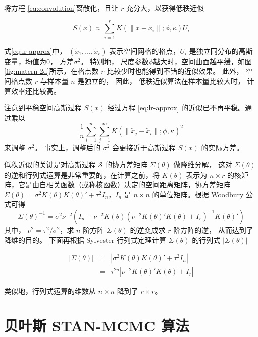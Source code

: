 \documentclass[12pt,a4paper,UTF8,twoside]{book}
\theoremstyle{definition}
\theoremstyle{definition}
\theoremstyle{definition}
\theoremstyle{remark}
\begin{document}
\noindent 将方程 \eqref{eq:convolution}离散化，且让 \(r\)
充分大，以获得低秩近似 \citep{PrevMap2017JSS}

\begin{equation}
S(x) \approx \sum_{i = 1}^r K(\|x-\tilde{x}_{i}\|; \phi, \kappa) U_{i} \label{eq:lr-approx}
\end{equation}

\noindent 式\eqref{eq:lr-approx}中，
\((\tilde{x}_{1},\ldots,\tilde{x}_{r})\) 表示空间网格的格点，\(U_{i}\)
是独立同分布的高斯变量，均值为0， 方差\(\sigma^2\)。 特别地，
尺度参数\(\phi\)越大时，空间曲面越平缓，如图
\ref{fig:matern-2d}所示，在格点数 \(r\) 比较少时也能得到不错的近似效果。
此外， 空间格点数 \(r\) 与样本量 \(n\) 是独立的， 因此，
低秩近似算法在样本量比较大时， 计算效率还比较高。

注意到平稳空间高斯过程 \(S(x)\) 经过方程 \eqref{eq:lr-approx}
的近似已不再平稳。通过乘以
\[\frac{1}{n}\sum_{i = 1}^n \sum_{j = 1}^m K(\|\tilde{x}_{j}-\tilde{x}_{i}\|; \phi, \kappa)^2\]
来调整 \(\sigma^2\)。 事实上，调整后的 \(\sigma^2\) 会更接近于高斯过程
\(S(x)\) 的实际方差。

低秩近似的关键是对高斯过程 \(\mathcal{S}\) 的协方差矩阵
\(\Sigma(\theta)\) 做降维分解， 这对 \(\Sigma(\theta)\)
的逆和行列式运算是非常重要的，在计算之前，将 \(K(\theta)\) 表示为
\(n\times r\)
的核矩阵，它是由自相关函数（或称核函数）决定的空间距离矩阵，协方差矩阵
\(\Sigma(\theta) = \sigma^2K(\theta)K(\theta)'+\tau^2 I_{n}\)，\(I_{n}\)
是 \(n\times n\) 的单位矩阵。根据 Woodbury 公式可得
\[\Sigma(\theta)^{-1} = \sigma^2\nu^{-2}(I_{n}-\nu^{-2}K(\theta)(\nu^{-2}K(\theta)' K(\theta)+I_{r})^{-1}K(\theta)')\]
其中， \(\nu^2 = \tau^2/\sigma^2\)，求 \(n\) 阶方阵 \(\Sigma(\theta)\)
的逆变成求 \(r\) 阶方阵的逆， 从而达到了降维的目的。 下面再根据
Sylvester 行列式定理计算 \(\Sigma(\theta)\) 的行列式
\(|\Sigma(\theta)|\)

\begin{eqnarray*}
|\Sigma(\theta)| & = & |\sigma^2K(\theta)K(\theta)'+\tau^2 I_{n}| \\ 
                 & = & \tau^{2n}|\nu^{-2}K(\theta)' K(\theta)+I_{r}|
\end{eqnarray*}

\noindent 类似地，行列式运算的维数从 \(n\times n\) 降到了
\(r\times r\)。

\hypertarget{STAN-MCMC}{%
\section{贝叶斯 STAN-MCMC 算法}\label{STAN-MCMC}}
\end{document}
